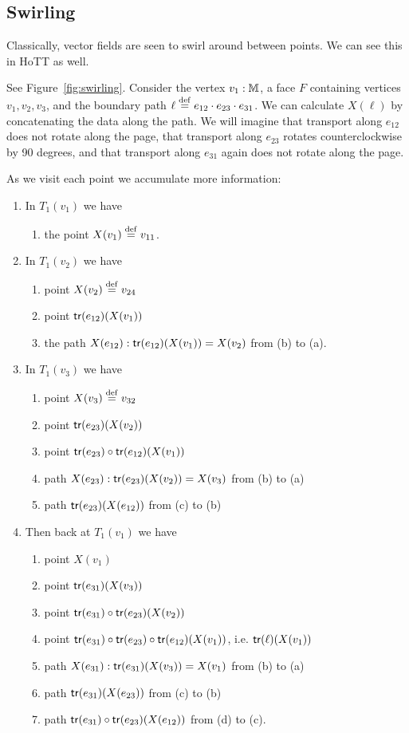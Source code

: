 \subsection{Swirling}
Classically, vector fields are seen to swirl around between points. We can see this in HoTT as well. 

See Figure~\ref{fig:swirling}. Consider the vertex \( v_1:\mathbb{M} \), a face \( F \) containing vertices \( v_1, v_2, v_3 \), and the boundary path \( \ell\stackrel{\mathrm{def}}{=} e_{12}\cdot e_{23} \cdot e_{31} \). We can calculate \( X(\ell) \) by concatenating the data along the path. We will imagine that transport along \( e_{12} \) does not rotate along the page, that transport along \( e_{23} \) rotates counterclockwise by 90 degrees, and that transport along \( e_{31} \) again does not rotate along the page.

As we visit each point we accumulate more information:

\begin{enumerate}
\item In \( T_1(v_1) \) we have 
\begin{enumerate}
\item the point \( X(v_1)\stackrel{\mathrm{def}}{=} v_{11} \).
\end{enumerate}
\item In \( T_1(v_2) \) we have
\begin{enumerate}
\item point \( X(v_2)\stackrel{\mathrm{def}}{=} v_{24} \)
\item point \( \mathsf{tr}(e_{12})(X(v_1)) \)
\item the path \( X(e_{12}):\mathsf{tr}(e_{12})(X(v_1))=X(v_2) \) from (b) to (a).
\end{enumerate}
\item In \( T_1(v_3) \) we have 
\begin{enumerate}
\item point \( X(v_3)\stackrel{\mathrm{def}}{=} v_{32} \)
\item point \( \mathsf{tr}(e_{23})(X(v_2)) \)
\item point \( \mathsf{tr}(e_{23})\circ\mathsf{tr}(e_{12})(X(v_1)) \)
\item path \( X(e_{23}):\mathsf{tr}(e_{23})(X(v_2))=X(v_3) \) from (b) to (a)
\item path \( \mathsf{tr}(e_{23})(X(e_{12})) \) from (c) to (b)
\end{enumerate}
\item Then back at \( T_1(v_1) \) we have
\begin{enumerate}
\item point \( X(v_1) \)
\item point \( \mathsf{tr}(e_{31})(X(v_3)) \)
\item point \( \mathsf{tr}(e_{31})\circ\mathsf{tr}(e_{23})(X(v_2)) \)
\item point \( \mathsf{tr}(e_{31})\circ\mathsf{tr}(e_{23})\circ\mathsf{tr}(e_{12})(X(v_1)) \), i.e. \( \mathsf{tr}(\ell)(X(v_1)) \)
\item path \( X(e_{31}): \mathsf{tr}(e_{31})(X(v_3))=X(v_1) \) from (b) to (a)
\item path \( \mathsf{tr}(e_{31})(X(e_{23})) \) from (c) to (b)
\item path \( \mathsf{tr}(e_{31})\circ\mathsf{tr}(e_{23})(X(e_{12})) \) from (d) to (c).
\end{enumerate}
\end{enumerate}


